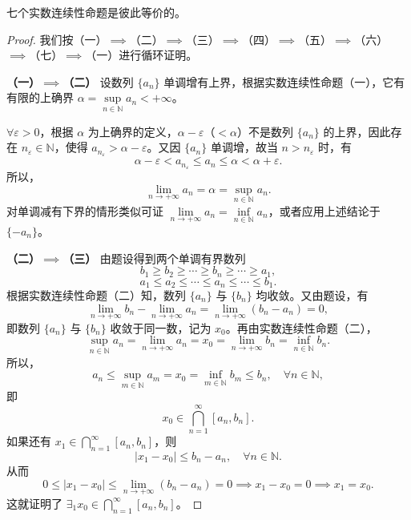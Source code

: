 \begin{theorem}[实数连续性等价命题]\label{thm:1.3.1}
七个实数连续性命题是彼此等价的。
\end{theorem}

\begin{proof}
我们按（一）$\implies$（二）$\implies$（三）$\implies$（四）$\implies$（五）$\implies$（六）$\implies$（七）$\implies$（一）进行循环证明。

\textbf{（一）$\implies$（二）} 设数列 $\{a_n\}$ 单调增有上界，根据实数连续性命题（一），它有有限的上确界 $\alpha = \sup\limits_{n\in\mathbb{N}} a_n < +\infty$。

$\forall \varepsilon > 0$，根据 $\alpha$ 为上确界的定义，$\alpha - \varepsilon$（$< \alpha$）不是数列 $\{a_n\}$ 的上界，因此存在 $n_\varepsilon \in \mathbb{N}$，使得 $a_{n_\varepsilon} > \alpha - \varepsilon$。又因 $\{a_n\}$ 单调增，故当 $n > n_\varepsilon$ 时，有
\[
\alpha - \varepsilon < a_{n_\varepsilon} \leqslant a_n \leqslant \alpha < \alpha + \varepsilon.
\]
所以，
\[
\lim_{n\to+\infty} a_n = \alpha = \sup_{n\in\mathbb{N}} a_n.
\]
对单调减有下界的情形类似可证 $\lim\limits_{n\to+\infty} a_n = \inf\limits_{n\in\mathbb{N}} a_n$，或者应用上述结论于 $\{-a_n\}$。

\textbf{（二）$\implies$（三）} 由题设得到两个单调有界数列
\[
b_1 \geqslant b_2 \geqslant \cdots \geqslant b_n \geqslant \cdots \geqslant a_1,
\]
\[
a_1 \leqslant a_2 \leqslant \cdots \leqslant a_n \leqslant \cdots \leqslant b_1.
\]
根据实数连续性命题（二）知，数列 $\{a_n\}$ 与 $\{b_n\}$ 均收敛。又由题设，有
\[
\lim_{n\to+\infty} b_n - \lim_{n\to+\infty} a_n = \lim_{n\to+\infty} (b_n - a_n) = 0,
\]
即数列 $\{a_n\}$ 与 $\{b_n\}$ 收敛于同一数，记为 $x_0$。再由实数连续性命题（二），
\[
\sup_{n\in\mathbb{N}} a_n = \lim_{n\to+\infty} a_n = x_0 = \lim_{n\to+\infty} b_n = \inf_{n\in\mathbb{N}} b_n.
\]
所以，
\[
a_n \leqslant \sup_{m\in\mathbb{N}} a_m = x_0 = \inf_{m\in\mathbb{N}} b_m \leqslant b_n,\quad \forall n \in \mathbb{N},
\]
即
\[
x_0 \in \bigcap_{n=1}^\infty [a_n, b_n].
\]
如果还有 $x_1 \in \bigcap\limits_{n=1}^\infty [a_n, b_n]$，则
\[
|x_1 - x_0| \leqslant b_n - a_n,\quad \forall n \in \mathbb{N}.
\]
从而
\[
0 \leqslant |x_1 - x_0| \leqslant \lim_{n\to+\infty} (b_n - a_n) = 0 \implies x_1 - x_0 = 0 \implies x_1 = x_0.
\]
这就证明了 $\exists_1 x_0 \in \bigcap\limits_{n=1}^\infty [a_n, b_n]$。


\end{proof}
